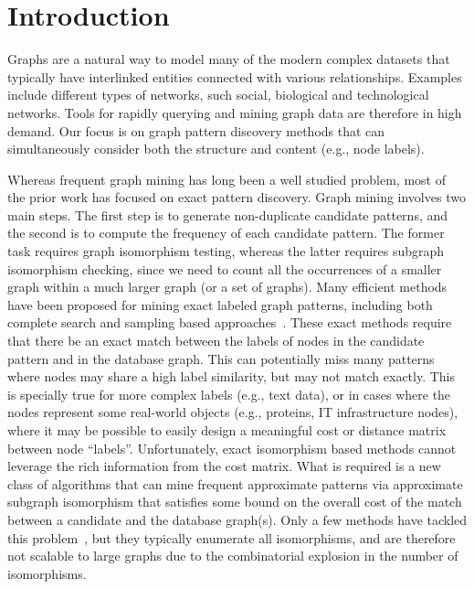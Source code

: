 \section{Introduction}
Graphs are a natural way to model many of the modern complex
datasets that typically have interlinked entities connected with various
relationships. Examples include different types of networks, such
social, biological and technological networks. Tools for rapidly
querying and mining graph data are therefore in high demand. Our focus
is on graph pattern discovery methods that can simultaneously consider
both the structure and content (e.g., node labels).

Whereas frequent graph mining has long been a well studied problem, most
of the prior work has focused on exact pattern discovery.
Graph mining involves two main steps. The first step is to generate
non-duplicate candidate patterns, and the second is to compute the
frequency of each candidate pattern. The former task requires graph
isomorphism testing, whereas the latter requires subgraph isomorphism
checking, since we need to count all the occurrences of a smaller graph
within a much larger graph (or a set of graphs). Many efficient methods
have been proposed for mining exact labeled graph patterns, including
both complete search and sampling based
approaches~\cite{gSpan,HWP03,kuramochi2005ffp,FSG01,IWM03,2009-graphsampling}.
These exact methods require that there be an exact match between the
labels of nodes in the candidate pattern and in the database graph. This
can potentially miss many patterns where nodes may share a high label
similarity, but may not match exactly. This is specially true for more
complex labels (e.g., text data), or in cases where the nodes represent
some real-world objects (e.g., proteins, IT infrastructure nodes), where
it may be possible to easily design a meaningful cost or distance matrix  between node ``labels''. Unfortunately, exact isomorphism
based methods cannot leverage the rich information from the cost matrix.
What is required is a new class of algorithms that can mine
frequent approximate patterns via approximate subgraph isomorphism that
satisfies some bound on the overall cost of the match between a candidate
and the database graph(s). Only a few methods have tackled this
problem~\cite{gapprox,JiaZH11,RAM2008}, but they typically enumerate all
isomorphisms, and are therefore not scalable to large graphs due to the
combinatorial explosion in the number of isomorphisms.

